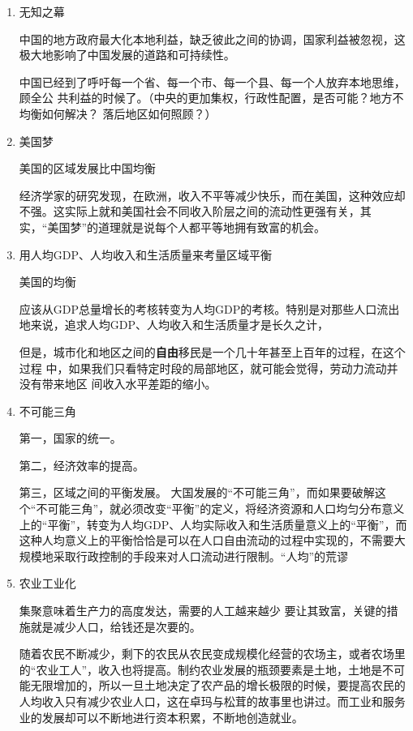 \begin{enumerate}
\item 无知之幕

  中国的地方政府最大化本地利益，缺乏彼此之间的协调，国家利益被忽视，这极大地影响了中国发展的道路和可持续性。

  中国已经到了呼吁每一个省、每一个市、每一个县、每一个人放弃本地思维，顾全公
  共利益的时候了。（中央的更加集权，行政性配置，是否可能？地方不均衡如何解决？
  落后地区如何照顾？）

\item 美国梦

  美国的区域发展比中国均衡

经济学家的研究发现，在欧洲，收入不平等减少快乐，而在美国，这种效应却不强。这实际上就和美国社会不同收入阶层之间的流动性更强有关，其实，“美国梦”的道理就是说每个人都平等地拥有致富的机会。

\item 用人均GDP、人均收入和生活质量来考量区域平衡


  美国的均衡

  应该从GDP总量增长的考核转变为人均GDP的考核。特别是对那些人口流出地来说，追求人均GDP、人均收入和生活质量才是长久之计，


  但是，城市化和地区之间的\textbf{自由}移民是一个几十年甚至上百年的过程，在这个过程
  中，如果我们只看特定时段的局部地区，就可能会觉得，劳动力流动并没有带来地区
  间收入水平差距的缩小。

\item 不可能三角

第一，国家的统一。

第二，经济效率的提高。

第三，区域之间的平衡发展。
大国发展的“不可能三角”，而如果要破解这个“不可能三角”，就必须改变“平衡”的定义，将经济资源和人口均匀分布意义上的“平衡”，转变为人均GDP、人均实际收入和生活质量意义上的“平衡”，而这种人均意义上的平衡恰恰是可以在人口自由流动的过程中实现的，不需要大规模地采取行政控制的手段来对人口流动进行限制。“人均”的荒谬

\item 农业工业化

集聚意味着生产力的高度发达，需要的人工越来越少
要让其致富，关键的措施就是减少人口，给钱还是次要的。


随着农民不断减少，剩下的农民从农民变成规模化经营的农场主，或者农场里的“农业工人”，收入也将提高。制约农业发展的瓶颈要素是土地，土地是不可能无限增加的，所以一旦土地决定了农产品的增长极限的时候，要提高农民的人均收入只有减少农业人口，这在卓玛与松茸的故事里也讲过。而工业和服务业的发展却可以不断地进行资本积累，不断地创造就业。


\end{enumerate}
